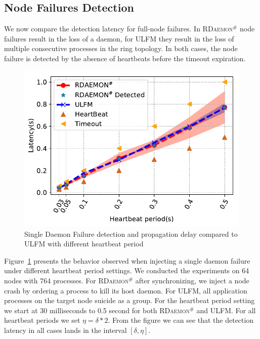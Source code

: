 \documentclass[sigconf]{acmart}
\newcommand{\ulfm}[0]{\textsc{ULFM}\xspace}
\newcommand{\ourwork}[0]{\textsc{RDaemon}\ensuremath{^\#}\xspace}
\begin{document}
\subsection{Node Failures Detection}
We now compare the detection latency for full-node failures. In \ourwork
node failures result in the loss of a daemon, for \ulfm they result in
the loss of multiple consecutive processes in the ring topology. In
both cases, the node failure is detected by the absence of heartbeats
before the timeout expiration.

\begin{figure}[h]
  \centering
  \includegraphics[width=\linewidth]{PRRTE_ULFM_comparision.pdf}
  \caption{Single Daemon Failure detection and propagation delay compared to \ulfm with different heartbeat period}
  \label{fig:node_failure_hb}
\end{figure}

Figure~\ref{fig:node_failure_hb} presents the behavior observed when injecting a single daemon failure under different heartbeat period settings. We conducted the experiments on 64 nodes with 764 processes. For \ourwork after synchronizing, we inject a node crash by ordering a process to kill its host daemon. For \ulfm,
all application processes on the target node suicide as a group.
For the heartbeat period setting we start at 30 milliseconds to 0.5 second for both \ourwork and \ulfm. For all heartbeat periods we set $ \eta = \delta * 2 $. From the figure we can see that the detection latency in all cases lands in the interval $[\delta,\eta]$.
\end{document}
